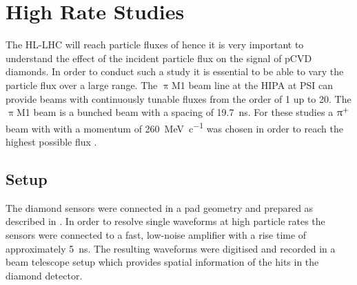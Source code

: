 \section{High Rate Studies}
The \ac{HL-LHC} will reach particle fluxes of  hence it is very important to understand the effect of the incident particle flux on the signal of \ac{pCVD} diamonds. In order to conduct such a study it is essential to be able to vary the particle flux over a large range. The $\uppi$M1 beam line at the \ac{HIPA} at \ac{PSI} \cite{hipa} can provide beams with continuously tunable fluxes from the order of \SI{1}{\khzcm} up to \SI{20}{\mhzcm}. The $\uppi$M1 beam is a bunched beam with a spacing of \SI{19.7}{\nano\second}. For these studies a $\uppi^{\text{+}}$ beam with with a momentum of \SI{260}{\mega\electronvolt\per c}  was chosen in order to reach the highest possible flux \cite{pim1}.\par
\subsection{Setup}
The diamond sensors were connected in a pad geometry and prepared as described in \cite{rainer}. 
In order to resolve single waveforms at high particle rates the sensors were connected to a fast, low-noise amplifier with a rise time of approximately \SI{5}{\nano\second}. The resulting waveforms were digitised and recorded in a beam telescope setup which provides spatial information of the hits in the diamond detector.\par
